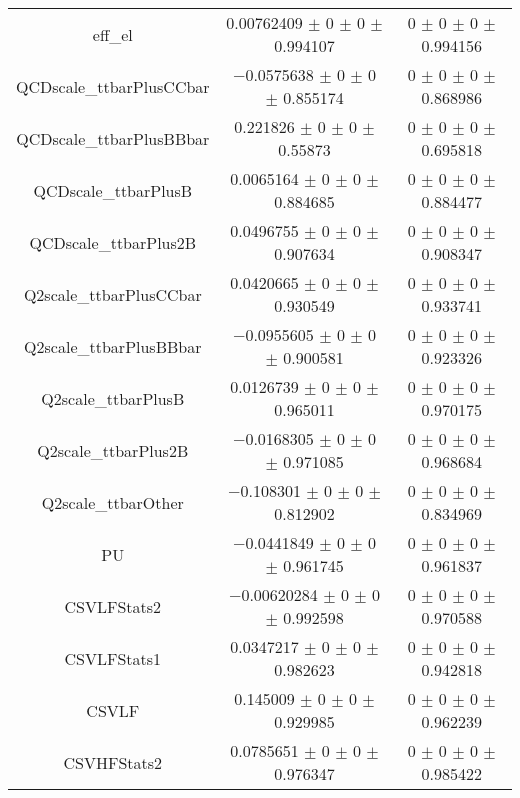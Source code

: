 \begin{table}
\begin{tabular}{ccc}
eff\_el & \num{0.00762409} $\pm$ \num{0} $\pm$ \num{0} $\pm$ \num{0.994107} & \num{0} $\pm$ \num{0} $\pm$ \num{0} $\pm$ \num{0.994156}\\
QCDscale\_ttbarPlusCCbar & \num{-0.0575638} $\pm$ \num{0} $\pm$ \num{0} $\pm$ \num{0.855174} & \num{0} $\pm$ \num{0} $\pm$ \num{0} $\pm$ \num{0.868986}\\
QCDscale\_ttbarPlusBBbar & \num{0.221826} $\pm$ \num{0} $\pm$ \num{0} $\pm$ \num{0.55873} & \num{0} $\pm$ \num{0} $\pm$ \num{0} $\pm$ \num{0.695818}\\
QCDscale\_ttbarPlusB & \num{0.0065164} $\pm$ \num{0} $\pm$ \num{0} $\pm$ \num{0.884685} & \num{0} $\pm$ \num{0} $\pm$ \num{0} $\pm$ \num{0.884477}\\
QCDscale\_ttbarPlus2B & \num{0.0496755} $\pm$ \num{0} $\pm$ \num{0} $\pm$ \num{0.907634} & \num{0} $\pm$ \num{0} $\pm$ \num{0} $\pm$ \num{0.908347}\\
Q2scale\_ttbarPlusCCbar & \num{0.0420665} $\pm$ \num{0} $\pm$ \num{0} $\pm$ \num{0.930549} & \num{0} $\pm$ \num{0} $\pm$ \num{0} $\pm$ \num{0.933741}\\
Q2scale\_ttbarPlusBBbar & \num{-0.0955605} $\pm$ \num{0} $\pm$ \num{0} $\pm$ \num{0.900581} & \num{0} $\pm$ \num{0} $\pm$ \num{0} $\pm$ \num{0.923326}\\
Q2scale\_ttbarPlusB & \num{0.0126739} $\pm$ \num{0} $\pm$ \num{0} $\pm$ \num{0.965011} & \num{0} $\pm$ \num{0} $\pm$ \num{0} $\pm$ \num{0.970175}\\
Q2scale\_ttbarPlus2B & \num{-0.0168305} $\pm$ \num{0} $\pm$ \num{0} $\pm$ \num{0.971085} & \num{0} $\pm$ \num{0} $\pm$ \num{0} $\pm$ \num{0.968684}\\
Q2scale\_ttbarOther & \num{-0.108301} $\pm$ \num{0} $\pm$ \num{0} $\pm$ \num{0.812902} & \num{0} $\pm$ \num{0} $\pm$ \num{0} $\pm$ \num{0.834969}\\
PU & \num{-0.0441849} $\pm$ \num{0} $\pm$ \num{0} $\pm$ \num{0.961745} & \num{0} $\pm$ \num{0} $\pm$ \num{0} $\pm$ \num{0.961837}\\
CSVLFStats2 & \num{-0.00620284} $\pm$ \num{0} $\pm$ \num{0} $\pm$ \num{0.992598} & \num{0} $\pm$ \num{0} $\pm$ \num{0} $\pm$ \num{0.970588}\\
CSVLFStats1 & \num{0.0347217} $\pm$ \num{0} $\pm$ \num{0} $\pm$ \num{0.982623} & \num{0} $\pm$ \num{0} $\pm$ \num{0} $\pm$ \num{0.942818}\\
CSVLF & \num{0.145009} $\pm$ \num{0} $\pm$ \num{0} $\pm$ \num{0.929985} & \num{0} $\pm$ \num{0} $\pm$ \num{0} $\pm$ \num{0.962239}\\
CSVHFStats2 & \num{0.0785651} $\pm$ \num{0} $\pm$ \num{0} $\pm$ \num{0.976347} & \num{0} $\pm$ \num{0} $\pm$ \num{0} $\pm$ \num{0.985422}\\

\end{tabular}
\end{table}
